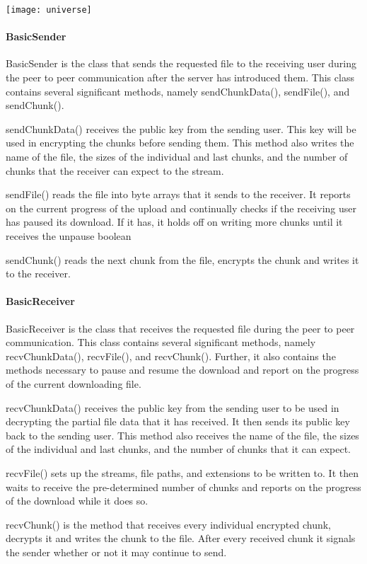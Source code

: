 \documentclass[12pt, a4paper]{article}
\begin{document}
\texttt{[image: universe]}

\paragraph{BasicSender}
BasicSender is the class that sends the requested file to the receiving user during the peer to peer communication after the server has introduced them. This class contains several significant methods, namely sendChunkData(), sendFile(), and sendChunk().

sendChunkData() receives the public key from the sending user. This key will be used in encrypting the chunks before sending them. This method also writes the name of the file, the sizes of the individual and last chunks, and the number of chunks that the receiver can expect to the stream.

sendFile() reads the file into byte arrays that it sends to the receiver. It reports on the current progress of the upload and continually checks if the receiving user has paused its download. If it has, it holds off on writing more chunks until it receives the unpause boolean

sendChunk() reads the next chunk from the file, encrypts the chunk and writes it to the receiver.

\paragraph{BasicReceiver}
BasicReceiver is the class that receives the requested file during the peer to peer communication. This class contains several significant methods, namely recvChunkData(), recvFile(), and recvChunk(). Further, it also contains the methods necessary to pause and resume the download and report on the progress of the current downloading file.

recvChunkData() receives the public key from the sending user to be used in decrypting the partial file data that it has received. It then sends its public key back to the sending user. This method also receives the name of the file, the sizes of the individual and last chunks, and the number of chunks that it can expect.

recvFile() sets up the streams, file paths, and extensions to be written to. It then waits to receive the pre-determined number of chunks and reports on the progress of the download while it does so.

recvChunk() is the method that receives every individual encrypted chunk, decrypts it and writes the chunk to the file. After every received chunk it signals the sender whether or not it may continue to send.
\end{document}
